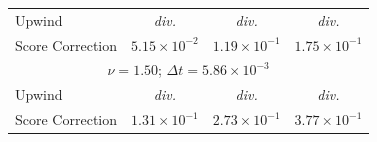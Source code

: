 \documentclass[letterpaper]{article} %
\begin{document}
\begin{table}[h]
\begin{tabular}{l | c c c}
        \hline
        Upwind                 & \textit{div.} & \textit{div.}  & \textit{div.} \\
        Score Correction       & $5.15\!\times\!10^{-2}$ & $1.19\!\times\!10^{-1}$ & $1.75\!\times\!10^{-1}$ \\
        \hline
        \multicolumn{4}{c}{$\nu = 1.50$; $\Delta t = 5.86\!\times\!10^{-3}$} \\
        \hline
        Upwind                 & \textit{div.} & \textit{div.} & \textit{div.} \\
        Score Correction       & $1.31\!\times\!10^{-1}$ & $2.73\!\times\!10^{-1}$ & $3.77\!\times\!10^{-1}$ \\
        \hline
    \end{tabular}
\end{table}
\end{document}
